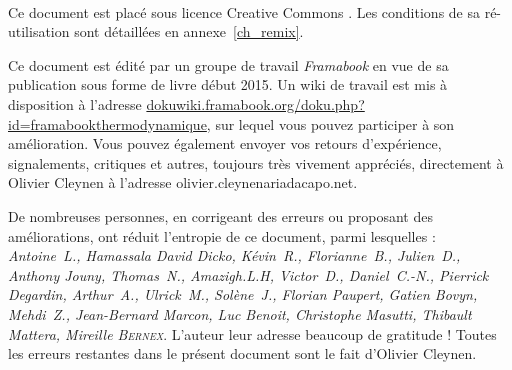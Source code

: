 \clearpage\thispagestyle{empty}



\vspace{-0.5cm}
{\center \normalsize \huge \ccLogo\ \ccAttribution\ \ccShareAlike \par}
\vspace{0.5cm}

Ce document est placé sous licence Creative Commons \myccbysa. Les conditions de sa ré-utilisation sont détaillées en annexe~\ref{ch_remix}.

\vspace{0.3cm}
\vspace{0.1cm}

Ce document est édité par un groupe de travail \textit{Framabook} en vue de sa publication sous forme de livre début 2015. Un wiki de travail est mis à disposition à l’adresse \href{http://dokuwiki.framabook.org/doku.php?id=framabookthermodynamique}{dokuwiki.framabook.org/doku.php?id=framabookthermodynamique}, sur lequel vous pouvez participer à son amélioration. Vous pouvez également envoyer vos retours d’expérience, signalements, critiques et autres, toujours très vivement appréciés, directement à Olivier Cleynen à l’adresse olivier.cleynenariadacapo.net.

De nombreuses personnes, en corrigeant des erreurs ou proposant des améliorations, ont réduit l’entropie de ce document, parmi lesquelles : {\small\textit{Antoine\ L., Hamassala David Dicko, Kévin\ R., Florianne\ B., Julien\ D., Anthony Jouny, Thomas\ N., Amazigh.L.H, Victor\ D., Daniel\ C.-N., Pierrick Degardin, Arthur\ A., Ulrick\ M., Solène\ J., Florian Paupert, Gatien Bovyn, Mehdi\ Z., Jean-Bernard Marcon, Luc Benoit, Christophe Masutti, Thibault Mattera, Mireille \textsc{Bernex}}}. L’auteur leur adresse beaucoup de gratitude ! Toutes les erreurs restantes dans le présent document sont le fait d’Olivier Cleynen.

\vspace{0.3cm}


\restoregeometry
